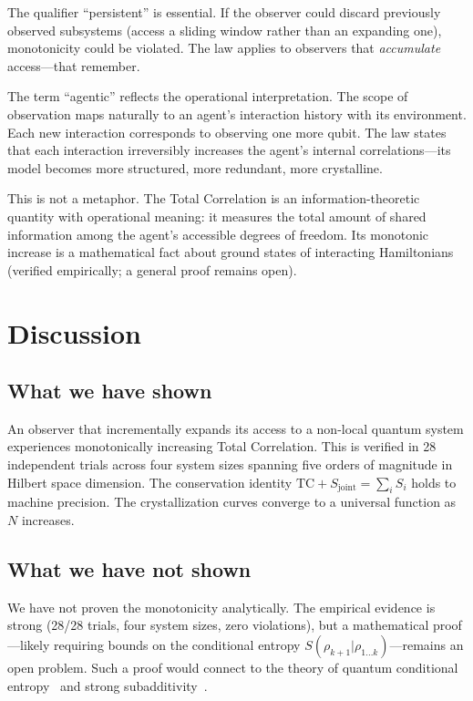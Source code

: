 \documentclass[aps,pra,twocolumn,superscriptaddress,floatfix]{revtex4-2}
\begin{document}
The qualifier ``persistent'' is essential.
If the observer could discard previously observed subsystems (access a sliding window rather than an expanding one), monotonicity could be violated.
The law applies to observers that \emph{accumulate} access---that remember.

The term ``agentic'' reflects the operational interpretation.
The scope of observation maps naturally to an agent's interaction history with its environment.
Each new interaction corresponds to observing one more qubit.
The law states that each interaction irreversibly increases the agent's internal correlations---its model becomes more structured, more redundant, more crystalline.

This is not a metaphor.
The Total Correlation is an information-theoretic quantity with operational meaning: it measures the total amount of shared information among the agent's accessible degrees of freedom.
Its monotonic increase is a mathematical fact about ground states of interacting Hamiltonians (verified empirically; a general proof remains open).


\section{Discussion}

\subsection{What we have shown}

An observer that incrementally expands its access to a non-local quantum system experiences monotonically increasing Total Correlation.
This is verified in 28 independent trials across four system sizes spanning five orders of magnitude in Hilbert space dimension.
The conservation identity $\mathrm{TC} + S_{\mathrm{joint}} = \sum_i S_i$ holds to machine precision.
The crystallization curves converge to a universal function as $N$ increases.

\subsection{What we have not shown}

We have not proven the monotonicity analytically.
The empirical evidence is strong (28/28 trials, four system sizes, zero violations), but a mathematical proof---likely requiring bounds on the conditional entropy $S(\rho_{k+1}|\rho_{1\ldots k})$---remains an open problem.
Such a proof would connect to the theory of quantum conditional entropy~\cite{lieb1973} and strong subadditivity~\cite{lieb1973b}.
\end{document}
